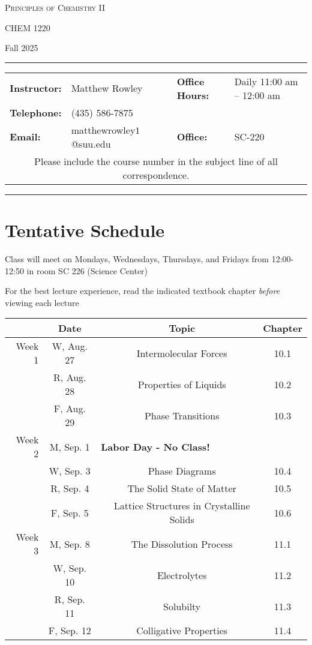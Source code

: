 \documentclass[12pt, letterpaper]{article}
\begin{document}
\begin{center}
	{\Large \textsc{Principles of Chemistry II}}
	
	CHEM 1220
\end{center}

\begin{center}
	{\large Fall 2025}
\end{center}
\begin{center}
	\rule{0.99\textwidth}{0.4pt}
	\begin{tabular}{llcll}
		\textbf{Instructor:} & Matthew Rowley           &  & \textbf{Office Hours:} & Daily 11:00 am -- 12:00 am \\
		\textbf{Telephone:}  & (435) 586-7875           &  &                        &  \\
		\textbf{Email:}      & matthewrowley$1$@suu.edu &  & \textbf{Office:}       & SC-220                   \\
		\multicolumn{5}{c}{Please include the course number in the subject line of all correspondence.}
	\end{tabular}
	\rule{0.99\textwidth}{0.4pt}
\end{center}

\section*{Tentative Schedule}
Class will meet on Mondays, Wednesdays, Thursdays, and Fridays from 12:00-12:50 in room SC 226 (Science Center)

\noindent For the best lecture experience, read the indicated textbook chapter \emph{before} viewing each lecture

\begin{tabular}{rcccc}
& Date && Topic & Chapter\\
\midrule
Week 1 & W, Aug. 27&& Intermolecular Forces & 10.1\\
& R, Aug. 28&& Properties of Liquids & 10.2\\
& F, Aug. 29&& Phase Transitions & 10.3\\
\midrule
Week 2 & M, Sep. 1& \multicolumn{3}{l}{\textbf{Labor Day - No Class!}}\\
& W, Sep. 3&& Phase Diagrams & 10.4\\
& R, Sep. 4&& The Solid State of Matter & 10.5\\
& F, Sep. 5&& Lattice Structures in Crystalline Solids & 10.6\\
\midrule
Week 3 & M, Sep. 8&& The Dissolution Process & 11.1\\
& W, Sep. 10&& Electrolytes & 11.2\\
& R, Sep. 11&& Solubilty & 11.3\\
& F, Sep. 12&& Colligative Properties & 11.4\\
\end{tabular}
\end{document}
